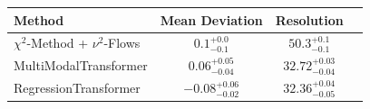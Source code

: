     \begin{tabular}{lccc}
        \toprule
        Method & Mean Deviation & Resolution \\
        \midrule
        $\chi^2$-Method + $\nu^2$-Flows & $0.1_{-0.1}^{+0.0}$ & $50.3_{-0.1}^{+0.1}$ \\
        MultiModalTransformer & $0.06_{-0.04}^{+0.05}$ & $32.72_{-0.04}^{+0.03}$ \\
        RegressionTransformer & $-0.08_{-0.02}^{+0.06}$ & $32.36_{-0.05}^{+0.04}$ \\
        \bottomrule
    \end{tabular}
